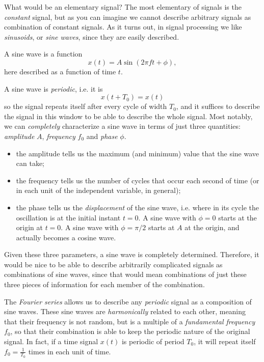 What would be an elementary signal? The most elementary of signals is the \emph{constant} signal, but as you can imagine we cannot describe arbitrary signals as combination of constant signals. As it turns out, in signal processing we like \emph{sinusoids}, or \emph{sine waves}, since they are easily described. 

A sine wave is a function
\begin{equation}
    x(t) = A \sin(2 \pi f t + \phi),
\end{equation}
here described as a function of time $t$.

A sine wave is \emph{periodic}, i.e. it is
\begin{equation}
    x(t + T_0) = x(t)
\end{equation}
so the signal repeats itself after every cycle of width $T_0$, and it suffices to describe the signal in this window to be able to describe the whole signal. 
Most notably, we can \emph{completely} characterize a sine wave in terms of just three quantities: \emph{amplitude} $A$, \emph{frequency} $f_0$ and \emph{phase} $\phi$.
\begin{itemize}
    \item the amplitude tells us the maximum (and minimum) value that the sine wave can take;
    \item the frequency tells us the number of cycles that occur each second of time (or in each unit of the independent variable, in general);
    \item the phase tells us the \emph{displacement} of the sine wave, i.e. where in its cycle the oscillation is at the initial instant $t = 0$. A sine wave with $\phi = 0$ starts at the origin at $t = 0$. A sine wave with $\phi = \pi/2$ starts at $A$ at the origin, and actually becomes a cosine wave.
\end{itemize}

Given these three parameters, a sine wave is completely determined. Therefore, it would be nice to be able to describe arbitrarily complicated signals as combinations of sine waves, since that would mean combinations of just these three pieces of information for each member of the combination.

The \emph{Fourier series} allows us to describe any \emph{periodic} signal as a composition of sine waves. These sine waves are \emph{harmonically} related to each other, meaning that their frequency is not random, but is a multiple of a \emph{fundamental frequency} $f_0$, so that their combination is able to keep the periodic nature of the original signal. In fact, if a time signal $x(t)$ is periodic of period $T_0$, it will repeat itself $f_0 = \frac{1}{T_0}$ times in each unit of time.


